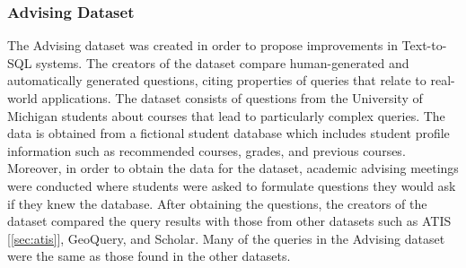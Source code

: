 \subsubsection{Advising Dataset}

The Advising dataset\cite{finegan-dollak-etal-2018-improving} was created in order to propose improvements in Text-to-SQL systems. The creators of the dataset compare human-generated and automatically generated questions, citing properties of queries that relate to real-world applications. The dataset consists of questions from the University of Michigan students about courses that lead to particularly complex queries. The data is obtained from a fictional student database which includes student profile information such as recommended courses, grades, and previous courses. Moreover, in order to obtain the data for the dataset, academic advising meetings were conducted where students were asked to formulate questions they would ask if they knew the database. After obtaining the questions, the creators of the dataset compared the query results with those from other datasets such as ATIS [\ref{sec:atis}], GeoQuery, and Scholar. Many of the queries in the Advising dataset were the same as those found in the other datasets.

